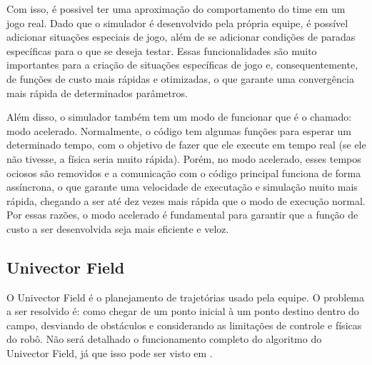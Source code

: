 \documentclass[10pt,fleqn,a4paper]{article}
\begin{document}
Com isso, é possivel ter uma aproximação do comportamento do time em um jogo real. Dado que o simulador é desenvolvido pela própria equipe, é possível adicionar situações especiais de jogo, além de se adicionar condições de paradas específicas para o que se deseja testar. Essas funcionalidades são muito importantes para a criação de situações específicas de jogo e, consequentemente, de funções de custo mais rápidas e otimizadas, o que garante uma convergência mais rápida de determinados parâmetros.

Além disso, o simulador também tem um modo de funcionar que é o chamado: modo acelerado. Normalmente, o código tem algumas funções para esperar um determinado tempo, com o objetivo de fazer que ele execute em tempo real (se ele não tivesse, a física seria muito rápida). Porém, no modo acelerado, esses tempos ociosos são removidos e a comunicação com o código principal funciona de forma assíncrona, o que garante uma velocidade de executação e simulação muito mais rápida, chegando a ser até dez vezes mais rápida que o modo de execução normal. Por essas razões, o modo acelerado é fundamental para garantir que a função de custo a ser desenvolvida seja mais eficiente e veloz.

\subsection{Univector Field}

O Univector Field é o planejamento de trajetórias usado pela equipe. O problema a ser resolvido é: como chegar de um ponto inicial à um ponto destino dentro do campo, desviando de obstáculos e considerando as limitações de controle e físicas do robô. Não será detalhado o funcionamento completo do algoritmo do Univector Field, já que isso pode ser visto em \cite{univector}.
\end{document}
